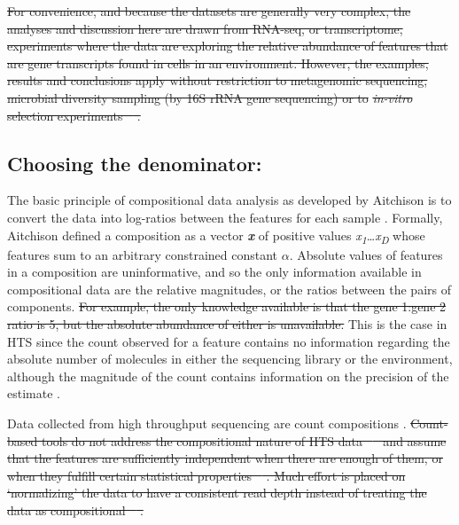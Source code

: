\documentclass[graybox]{svmult}
\providecommand{\DIFadd}[1]{{\protect\color{blue}\uwave{#1}}} %
\providecommand{\DIFdel}[1]{{\protect\color{red}\sout{#1}}}                      %
\providecommand{\DIFaddbegin}{} %
\providecommand{\DIFaddend}{} %
\providecommand{\DIFdelbegin}{} %
\providecommand{\DIFdelend}{} %
\begin{document}
\DIFdel{For convenience, and because the datasets are generally very complex, the analyses and discussion here are drawn from RNA-seq, or transcriptome, experiments where the data are exploring the relative abundance of features that are gene transcripts found in cells in an environment. However, the examples, results and conclusions apply without restriction to metagenomic sequencing, microbial diversity sampling (by 16S rRNA gene sequencing) or to }\textit{\DIFdel{in-vitro}} %
\DIFdel{selection experiments \mbox{%
\cite{fernandes:2014,mcmurrough:2014,gloorFrontiers:2017}}%
. 
}%

\DIFdelend \subsection*{Choosing the denominator:}
\label{subsec1:2}

The basic principle of compositional data analysis as developed by Aitchison is to convert the data into log-ratios between the features for each sample \cite{Aitchison:1986}. Formally, Aitchison defined a composition as a vector \textit{\textbf{x}}  of positive values \textit{x\textsubscript{1}}\ldots\textit{x\textsubscript{D}} whose features  sum to an arbitrary constrained constant $\alpha$. Absolute values of features in a composition are uninformative, and so the only information available in compositional data are the relative magnitudes, or the ratios between the pairs of components. \DIFdelbegin \DIFdel{For example, the only knowledge available is that the gene 1:gene 2 ratio is 5, but the absolute abundance of either is unavailable. }\DIFdelend This is the case in HTS since the count observed for a feature contains no information regarding the absolute number of molecules in either the sequencing library or the environment, although the magnitude of the count contains information on the precision of the estimate \DIFaddbegin \DIFadd{\mbox{%
\cite{gloorAJS:2016,fernandes:2013}}%
}\DIFaddend .

Data collected from high throughput sequencing are count compositions \cite{fernandes:2014,gloorAJS:2016}. \DIFdelbegin \DIFdel{Count-based tools do not address the compositional nature of HTS data \mbox{%
\cite{gloorAJS:2016,fernandes:2014} }%
and assume that the features are sufficiently independent when there are enough of them, or when they fulfill certain statistical properties \mbox{%
\cite{Weiss:2016aa}}%
. Much effort is placed on `normalizing' the data to have a consistent read depth instead of treating the data as compositional \mbox{%
\cite{Sun:2013aa,McMurdie:2014a}}%
.
}%
\end{document}
